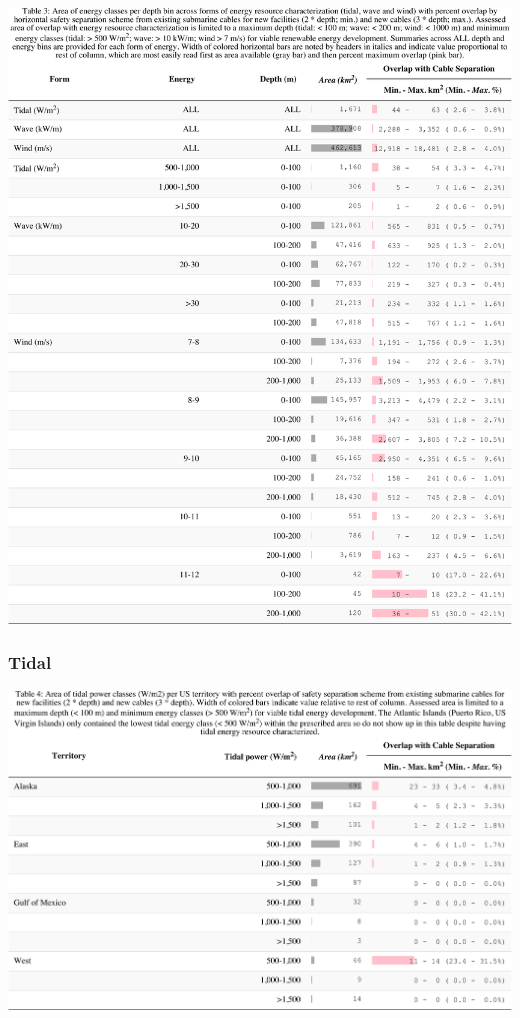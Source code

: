 \documentclass[]{article}
\begin{document}
\includegraphics{report_files/figure-latex/tbl03Energy-1.pdf}

\hypertarget{tidal}{%
\subsubsection{Tidal}\label{tidal}}

\includegraphics{report_files/figure-latex/tbl04Tide-1.pdf}
\end{document}
